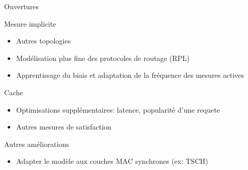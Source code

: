 \begin{frame}{Ouvertures}
  
  \begin{block}{Mesure implicite}
    \begin{itemize}
      \item Autres topologies
      \item Modélisation plus fine des protocoles de routage (RPL)
      \item Apprentissage du biais et adaptation de la fréquence des mesures actives
    \end{itemize}
  \end{block}


  \begin{block}{Cache}
    \begin{itemize}
      \item Optimisations supplémentaires: latence, popularité d'une requete
      \item Autres mesures de satisfaction
    \end{itemize}
  \end{block}

\begin{block}{Autres améliorations}
    \begin{itemize}
        \item Adapter le modèle aux couches MAC synchrones (ex: TSCH)
    \end{itemize}
  \end{block}



\end{frame}
